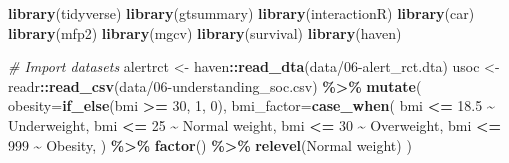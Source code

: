 \documentclass[
]{book}
\newenvironment{Shaded}{\begin{snugshade}}{\end{snugshade}}
\newcommand{\AttributeTok}[1]{\textcolor[rgb]{0.13,0.29,0.53}{#1}}
\newcommand{\CommentTok}[1]{\textcolor[rgb]{0.56,0.35,0.01}{\textit{#1}}}
\newcommand{\DecValTok}[1]{\textcolor[rgb]{0.00,0.00,0.81}{#1}}
\newcommand{\FloatTok}[1]{\textcolor[rgb]{0.00,0.00,0.81}{#1}}
\newcommand{\FunctionTok}[1]{\textcolor[rgb]{0.13,0.29,0.53}{\textbf{#1}}}
\newcommand{\NormalTok}[1]{#1}
\newcommand{\OtherTok}[1]{\textcolor[rgb]{0.56,0.35,0.01}{#1}}
\newcommand{\SpecialCharTok}[1]{\textcolor[rgb]{0.81,0.36,0.00}{\textbf{#1}}}
\newcommand{\StringTok}[1]{\textcolor[rgb]{0.31,0.60,0.02}{#1}}
\begin{document}
\begin{Shaded}
\begin{Highlighting}[]
\FunctionTok{library}\NormalTok{(tidyverse)}
\FunctionTok{library}\NormalTok{(gtsummary)}
\FunctionTok{library}\NormalTok{(interactionR)}
\FunctionTok{library}\NormalTok{(car)}
\FunctionTok{library}\NormalTok{(mfp2)}
\FunctionTok{library}\NormalTok{(mgcv)}
\FunctionTok{library}\NormalTok{(survival)}
\FunctionTok{library}\NormalTok{(haven)}
\end{Highlighting}
\end{Shaded}

\begin{Shaded}
\begin{Highlighting}[]
\CommentTok{\# Import datasets}
\NormalTok{alertrct }\OtherTok{\textless{}{-}}\NormalTok{ haven}\SpecialCharTok{::}\FunctionTok{read\_dta}\NormalTok{(}\StringTok{\textquotesingle{}data/06{-}alert\_rct.dta\textquotesingle{}}\NormalTok{)}
\NormalTok{usoc }\OtherTok{\textless{}{-}}\NormalTok{ readr}\SpecialCharTok{::}\FunctionTok{read\_csv}\NormalTok{(}\StringTok{\textquotesingle{}data/06{-}understanding\_soc.csv\textquotesingle{}}\NormalTok{) }\SpecialCharTok{\%\textgreater{}\%} 
  \FunctionTok{mutate}\NormalTok{(}
    \AttributeTok{obesity=}\FunctionTok{if\_else}\NormalTok{(bmi }\SpecialCharTok{\textgreater{}=} \DecValTok{30}\NormalTok{, }\DecValTok{1}\NormalTok{, }\DecValTok{0}\NormalTok{), }
    \AttributeTok{bmi\_factor=}\FunctionTok{case\_when}\NormalTok{(}
\NormalTok{      bmi }\SpecialCharTok{\textless{}=} \FloatTok{18.5} \SpecialCharTok{\textasciitilde{}} \StringTok{\textquotesingle{}Underweight\textquotesingle{}}\NormalTok{, }
\NormalTok{      bmi }\SpecialCharTok{\textless{}=} \DecValTok{25} \SpecialCharTok{\textasciitilde{}} \StringTok{\textquotesingle{}Normal weight\textquotesingle{}}\NormalTok{, }
\NormalTok{      bmi }\SpecialCharTok{\textless{}=} \DecValTok{30} \SpecialCharTok{\textasciitilde{}} \StringTok{\textquotesingle{}Overweight\textquotesingle{}}\NormalTok{, }
\NormalTok{      bmi }\SpecialCharTok{\textless{}=} \DecValTok{999} \SpecialCharTok{\textasciitilde{}} \StringTok{\textquotesingle{}Obesity\textquotesingle{}}\NormalTok{, }
\NormalTok{    ) }\SpecialCharTok{\%\textgreater{}\%} 
      \FunctionTok{factor}\NormalTok{() }\SpecialCharTok{\%\textgreater{}\%} 
      \FunctionTok{relevel}\NormalTok{(}\StringTok{\textquotesingle{}Normal weight\textquotesingle{}}\NormalTok{)}
\NormalTok{  )}
\end{Highlighting}
\end{Shaded}
\end{document}

